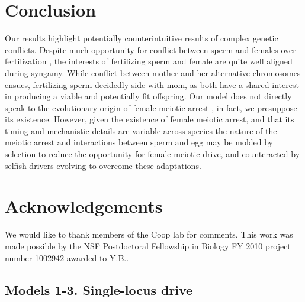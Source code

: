\documentclass[12pt,letterpaper]{article}
\begin{document}
\section*{Conclusion}
Our results highlight potentially counterintuitive results of complex genetic conflicts. 
Despite much opportunity for conflict between sperm and females over fertilization \citep{Partridge1998},
	the interests of fertilizing sperm and female are quite well aligned during syngamy.
While conflict between mother and her alternative chromosomes ensues, 
	fertilizing sperm decidedly side with mom, as both have a shared interest in producing a viable and potentially fit offspring. 
Our model does not directly speak to the evolutionary origin of
  female meiotic arrest \citep[for a review and evaluation of such
  hypotheses see][]{Mira1998}, in fact, we presuppose its existence.
However, given the existence of female meiotic arrest, 
	and that its timing and mechanistic details are variable
        across species \citep[Figure \ref{Meiotic_fig}, and] []{Masui_book,Karrbook:09}
	the nature of the meiotic arrest and interactions between
        sperm and egg may  be molded by selection to reduce the opportunity for female meiotic drive, 
	and counteracted by selfish drivers evolving to overcome these adaptations. 

\newpage 
\section*{Acknowledgements}
We would like to thank members of the Coop lab for comments. This work was made possible by the NSF Postdoctoral Fellowship in Biology FY 2010 project number 1002942 awarded to Y.B..
\newpage 

\newpage 
  \appendix


\subsection*{Models 1-3. Single-locus drive}
\end{document}
